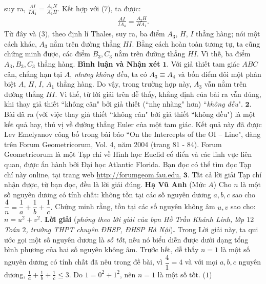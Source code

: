 \begin{multicols}{2}
	suy ra,  $\frac{{AI}}{{I{A_4}}} = \frac{{{A_1}N}}{{{A_1}H}}$. Kết hợp với ($7$), ta được:
	\begin{align*}
		\frac{{AI}}{{I{A_4}}} = \frac{{{A_2}H}}{{H{A_1}}}.
	\end{align*}
	Từ đây và ($3$), theo định lí Thales, suy ra, ba điểm  $A_3$, $H$, $I$ thẳng hàng; nói một cách khác, $A_3$  nằm trên đường thẳng $HI$.
	\vskip 0.05cm
	Bằng cách hoàn toàn tương tự, ta cũng chứng minh được, các điểm $B_3, C_3$  nằm trên đường thẳng $HI$. Vì thế, ba điểm  $A_3, B_3 ,C_3$  thẳng hàng.
	\vskip 0.05cm
	\textbf{Bình luận và Nhận xét}
	\vskip 0.05cm
	$\pmb{1.}$ Với giả thiết tam giác $ABC$ cân, chẳng hạn tại $A$, \textit{nhưng không đều}, ta có  $A_3 \equiv A_4$ và bốn điểm đôi một phân biệt $A$, $H$, $I$, $A_1$  thẳng hàng. Do vậy, trong trường hợp này,  $A_3$ vẫn nằm trên đường thẳng $HI$. Vì thế, từ lời giải trên dễ thấy, khẳng định của bài ra vẫn đúng, khi thay giả thiết ``không cân" bởi giả thiết (``nhẹ nhàng" hơn) ``\textit{không đều}".
	\vskip 0.05cm
	$\pmb{2.}$ Bài đã ra (với việc thay giả thiết ``không cân" bởi giả thiết ``không đều") là một kết quả hay, thú vị về đường thẳng Euler của một tam giác. Kết quả này đã được Lev Emelyanov công bố trong bài báo ``On the Intercepts of the OI -- Line", đăng trên Forum Geometricorum, Vol. 4, năm 2004 (trang 81 - 84).
	Forum Geometricorum là một Tạp chí về Hình học Euclid cổ điển và các lĩnh vực liên quan, được ấn hành bởi Đại học Atlantic Florida. Bạn đọc có thể tìm đọc Tạp chí này online, tại trang web \url{http://forumgeom.fau.edu.}
	\vskip 0.05cm
	$\pmb{3.}$ Tất cả lời giải Tạp chí nhận được, từ bạn đọc, đều là lời giải đúng.
	\vskip 0.05cm
	\hfill	\textbf{Hạ Vũ Anh}
	\vskip 0.05cm
	{}
	(Mức $A$) Cho $n$ là một số nguyên dương có tính chất: không tồn tại các số nguyên dương $a,b,c$ sao cho $\dfrac4n=\dfrac 1a+\dfrac 1b+\dfrac 1c.$ Chứng minh rằng, tồn tại các số nguyên không âm $u,v$ sao cho: $n=u^2+v^2$.  
	\vskip 0.05cm
	\textbf{Lời giải} (\textit{phỏng theo lời giải của bạn Hồ Trần Khánh Linh, lớp $12$ Toán $2$, trường THPT chuyên ĐHSP, ĐHSP Hà Nội})\textbf{.}
	\vskip 0.05cm
	Trong Lời giải này, ta qui ước gọi một số nguyên dương là \textit{số tốt}, nếu nó biểu diễn được dưới dạng tổng bình phương của hai số nguyên không âm.
	\vskip 0.05cm
	Trước hết, dễ thấy $n = 1$ là một số nguyên dương có tính chất đã nêu trong đề bài, vì $\dfrac{4}{1} = 4$ và với mọi $a, b, c$ nguyên dương, $\frac{1}{a} + \frac{1}{b} + \frac{1}{c} \le 3$.
	\vskip 0.05cm
	Do  $1 = 0^2 + 1^2$, nên $n = 1$ là một số tốt. \hfill ($1$)

\end{multicols}
